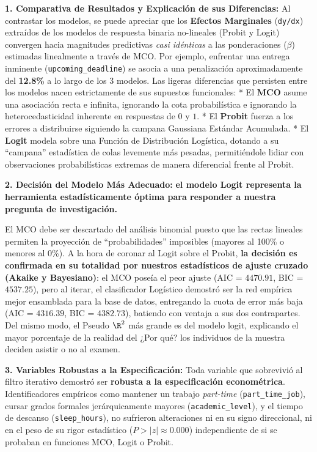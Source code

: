 \documentclass[11pt]{article}
\begin{document}
\textbf{1. Comparativa de Resultados y Explicación de sus Diferencias:}
Al contrastar los modelos, se puede apreciar que los \textbf{Efectos
Marginales} (\texttt{dy/dx}) extraídos de los modelos de respuesta
binaria no-lineales (Probit y Logit) convergen hacia magnitudes
predictivas \emph{casi idénticas} a las ponderaciones (\(\beta\))
estimadas linealmente a través de MCO. Por ejemplo, enfrentar una
entrega inminente (\texttt{upcoming\_deadline}) se asocia a una
penalización aproximadamente del \textbf{12.8\%} a lo largo de los 3
modelos. Las ligeras diferencias que persisten entre los modelos nacen
estrictamente de sus supuestos funcionales: * El \textbf{MCO} asume una
asociación recta e infinita, ignorando la cota probabilística e
ignorando la heterocedasticidad inherente en respuestas de \(0\) y
\(1\). * El \textbf{Probit} fuerza a los errores a distribuirse
siguiendo la campana Gaussiana Estándar Acumulada. * El \textbf{Logit}
modela sobre una Función de Distribución Logística, dotando a su
``campana'' estadística de colas levemente más pesadas, permitiéndole
lidiar con observaciones probabilísticas extremas de manera diferencial
frente al Probit.

\textbf{2. Decisión del Modelo Más Adecuado:} \textbf{el modelo Logit
representa la herramienta estadísticamente óptima para responder a
nuestra pregunta de investigación.}

El MCO debe ser descartado del análisis binomial puesto que las rectas
lineales permiten la proyección de ``probabilidades'' imposibles
(mayores al 100\% o menores al 0\%). A la hora de coronar al Logit sobre
el Probit, \textbf{la decisión es confirmada en su totalidad por
nuestros estadísticos de ajuste cruzado (Akaike y Bayesiano)}: el MCO
poseía el peor ajuste (AIC = \(4470.91\), BIC = \(4537.25\)), pero al
iterar, el clasificador Logístico demostró ser la red empírica mejor
ensamblada para la base de datos, entregando la cuota de error más baja
(AIC = \(4316.39\), BIC = \(4382.73\)), batiendo con ventaja a sus dos
contrapartes. Del mismo modo, el Pseudo \(\R^2\) más grande es del
modelo logit, explicando el mayor porcentaje de la realidad del ¿Por
qué? los individuos de la muestra deciden asistir o no al examen.

\textbf{3. Variables Robustas a la Especificación:} Toda variable que
sobrevivió al filtro iterativo demostró ser \textbf{robusta a la
especificación econométrica}. Identificadores empíricos como mantener un
trabajo \emph{part-time} (\texttt{part\_time\_job}), cursar grados
formales jerárquicamente mayores (\texttt{academic\_level}), y el tiempo
de descanso (\texttt{sleep\_hours}), no sufrieron alteraciones ni en su
signo direccional, ni en el peso de su rigor estadístico
(\(P>|z| \approx 0.000\)) independiente de si se probaban en funciones
MCO, Logit o Probit.
\end{document}
